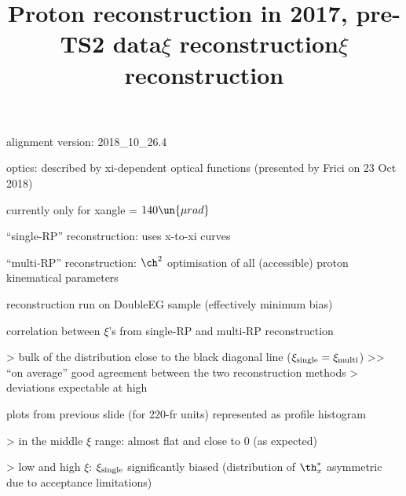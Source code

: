 


\newpage %

\def\author{J.~Kašpar}
\def\caption{Proton reconstruction, 2017, pre-TS2}
\def\date{26 Oct 2018}

\newpage %
\title{Proton reconstruction in 2017, pre-TS2 data}

\> alignment version: 2018\_10\_26.4

\> optics: described by xi-dependent optical functions (presented by Frici on 23 Oct 2018)

\> currently only for xangle = $140\un{\mu rad}$

\> ``single-RP'' reconstruction: uses x-to-xi curves

\> ``multi-RP'' reconstruction: $\ch^2$ optimisation of all (accessible) proton kinematical parameters

\> reconstruction run on DoubleEG sample (effectively minimum bias)



\newpage %
\title{$\xi$ reconstruction}

\> correlation between $\xi$'s from single-RP and multi-RP reconstruction

\centerline{}

\>> bulk of the distribution close to the black diagonal line ($\xi_{\rm single} = \xi_{\rm multi}$)
\>>> ``on average'' good agreement between the two reconstruction methods
\>> deviations expectable at high


\newpage %
\title{$\xi$ reconstruction}

\> plots from previous slide (for 220-fr units) represented as profile histogram

\centerline{}

\>> in the middle $\xi$ range: almost flat and close to 0 (as expected)

\>> low and high $\xi$: $\xi_{\rm single}$ significantly biased (distribution of $\th^*_x$ asymmetric due to acceptance limitations)



